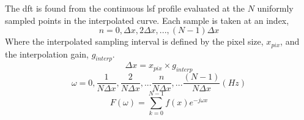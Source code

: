 \documentclass[../main.tex]{subfiles}%
\begin{document}
%
    \Xequation%
    The \gls{dft} is found from the continuous \gls{lsf} profile evaluated at the $N$ uniformly sampled points in the interpolated curve.
    Each sample is taken at an index,
    \begin{equation}%
        n = 0, \Delta x, 2\Delta x, ..., (N-1)\Delta x%
    \end{equation}%
    Where the interpolated sampling interval is defined by the pixel size, $x_{pix}$, and the interpolation gain, $g_{interp}$.
    \begin{equation}%
        \Delta x = x_{pix} \times g_{interp} %
    \end{equation}%
    \begin{equation}%
        \omega = 0, \dfrac{1}{N\Delta x}, \dfrac{2}{N\Delta x}, ...\dfrac{n}{N\Delta x}, ...\dfrac{(N-1)}{N\Delta x} (Hz)%
    \end{equation}%
    \begin{equation}%
        F(\omega) = \sum_{k=0}^{N-1} f(x) e^{-j \omega x}%
    \end{equation}%


\end{document}
